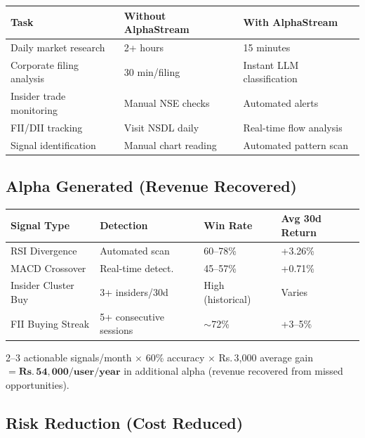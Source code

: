 \documentclass[11pt, a4paper]{article}
\newcommand{\Rs}{Rs.\,}
\begin{document}
\begin{center}
\small
\begin{tabular}{L{4.5cm} L{3.5cm} L{3.5cm}}
  \toprule
  \textbf{Task} & \textbf{Without AlphaStream} & \textbf{With AlphaStream} \\
  \midrule
  Daily market research      & 2+ hours         & 15 minutes \\
  Corporate filing analysis  & 30 min/filing    & Instant LLM classification \\
  Insider trade monitoring   & Manual NSE checks & Automated alerts \\
  FII/DII tracking           & Visit NSDL daily  & Real-time flow analysis \\
  Signal identification      & Manual chart reading & Automated pattern scan \\
  \bottomrule
\end{tabular}
\end{center}

\subsection{Alpha Generated (Revenue Recovered)}

\begin{center}
\small
\begin{tabular}{L{3.5cm} L{3.5cm} C{2cm} C{3cm}}
  \toprule
  \textbf{Signal Type} & \textbf{Detection} & \textbf{Win Rate} & \textbf{Avg 30d Return} \\
  \midrule
  RSI Divergence      & Automated scan   & 60--78\% & +3.26\% \\
  MACD Crossover      & Real-time detect.& 45--57\% & +0.71\% \\
  Insider Cluster Buy & 3+ insiders/30d  & High (historical) & Varies \\
  FII Buying Streak   & 5+ consecutive sessions & $\sim$72\% & +3--5\% \\
  \bottomrule
\end{tabular}
\end{center}

\begin{orangebox}[title={Conservative Alpha Estimate}]
2--3 actionable signals/month $\times$ 60\% accuracy $\times$ \Rs{}3,000 average gain
$= \mathbf{\Rs{}54,000/user/year}$ in additional alpha (revenue recovered from missed opportunities).
\end{orangebox}

\subsection{Risk Reduction (Cost Reduced)}
\end{document}
